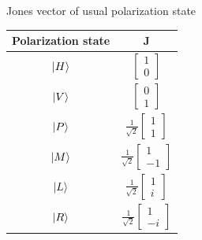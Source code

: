 \documentclass[12pt, dvipsnames]{beamer}
\numberwithin{equation}{section}
\begin{document}
\begin{frame}{Jones vector of usual polarization state}
	\begin{table}[H]
		\centering
		\begin{tabular}{ c c } 
			Polarization state & $\boldsymbol{J}$\\
			\hline
			$\ket{H}$ & $\begin{bmatrix}1\\0\end{bmatrix}$ \\ \hline
			$\ket{V}$ & $\begin{bmatrix}0\\1\end{bmatrix}$ \\ \hline
			$\ket{P}$ & $\frac{1}{\sqrt{2}}\begin{bmatrix}1\\1\end{bmatrix}$ \\ \hline
			$\ket{M}$ & $\frac{1}{\sqrt{2}}\begin{bmatrix}1\\-1\end{bmatrix}$ \\ \hline
			$\ket{L}$ & $\frac{1}{\sqrt{2}}\begin{bmatrix}1\\i\end{bmatrix}$ \\ \hline
			$\ket{R}$ & $\frac{1}{\sqrt{2}}\begin{bmatrix}1\\-i\end{bmatrix}$ \\ 
			\hline
		\end{tabular}
		\label{table:1}
	\end{table}
\end{frame}
\end{document}
